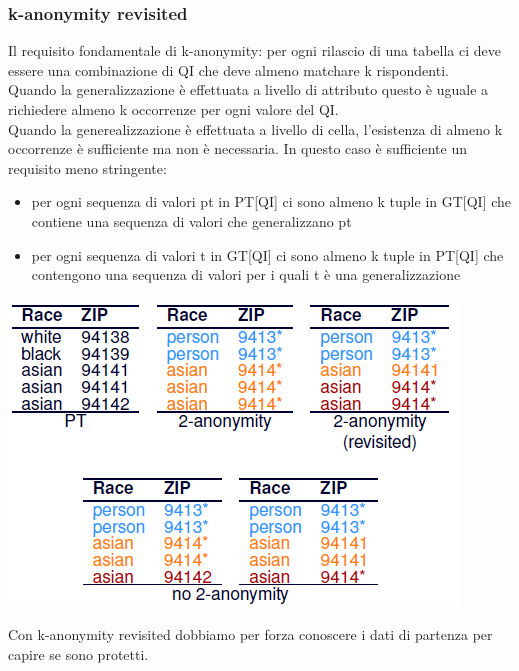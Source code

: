 \subsubsection{k-anonymity revisited}
Il requisito fondamentale di k-anonymity: per ogni rilascio di una tabella ci deve essere una combinazione di QI che deve almeno matchare k rispondenti.\\
Quando la generalizzazione è effettuata a livello di attributo questo è uguale a richiedere almeno k occorrenze per ogni valore del QI. \\
Quando la generealizzazione è effettuata a livello di cella, l'esistenza di almeno k occorrenze è sufficiente ma non è necessaria. In questo caso è sufficiente un requisito meno stringente:
\begin{itemize}
    \item per ogni sequenza di valori pt in PT[QI] ci sono almeno k tuple in GT[QI] che contiene una sequenza di valori che generalizzano pt
    \item per ogni sequenza di valori t in GT[QI] ci sono almeno k tuple in PT[QI] che contengono una sequenza di valori per i quali t è una generalizzazione
\end{itemize}
\begin{center}
    \includegraphics[scale=0.6]{img/kanonriv.png}
\end{center}
Con k-anonymity revisited dobbiamo per forza conoscere i dati di partenza per capire se sono protetti.
\clearpage
